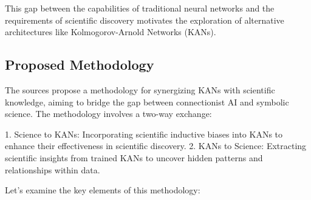 This gap between the capabilities of traditional neural networks and the
requirements of scientific discovery motivates the exploration of alternative
architectures like Kolmogorov-Arnold Networks (KANs).

\clearpage

\subsection{Proposed Methodology}

The sources propose a methodology for synergizing KANs with scientific
knowledge, aiming to bridge the gap between connectionist AI and symbolic
science. The methodology involves a two-way exchange:

1. Science to KANs: Incorporating scientific inductive biases into KANs to enhance their effectiveness in scientific discovery.
2. KANs to Science: Extracting scientific insights from trained KANs to uncover hidden patterns and relationships within data.

Let's examine the key elements of this methodology:

